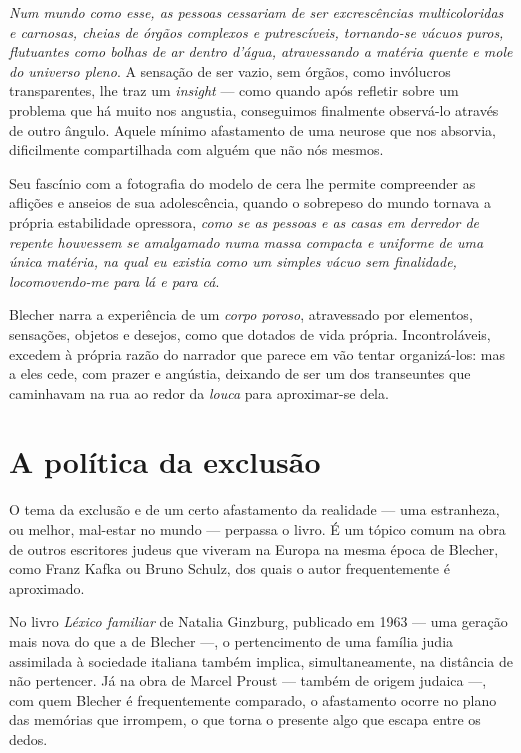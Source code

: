  \textit{Num mundo como esse, as pessoas cessariam de ser excrescências multicoloridas e carnosas, cheias de órgãos complexos e putrescíveis, tornando-se vácuos puros, flutuantes como bolhas de ar dentro d'água, atravessando a matéria quente e mole do universo pleno}. A sensação de ser vazio, sem órgãos, como invólucros transparentes, lhe traz um \textit{insight} --- como quando após refletir sobre um problema que há muito nos angustia, conseguimos finalmente observá-lo através de outro ângulo. Aquele mínimo afastamento de uma neurose que nos absorvia, dificilmente compartilhada com alguém que não nós mesmos.

Seu fascínio com a fotografia do modelo de cera lhe permite compreender as aflições e anseios de sua adolescência, quando o sobrepeso do mundo tornava a própria estabilidade opressora, \textit{como se as pessoas e as casas em derredor de repente houvessem se amalgamado numa massa compacta e uniforme de uma única matéria, na qual eu existia como um simples vácuo sem finalidade, locomovendo-me para lá e para cá}.

Blecher narra a experiência de um \textit{corpo poroso}, atravessado por elementos, sensações, objetos e desejos, como que dotados de vida própria. Incontroláveis, excedem à própria razão do narrador que parece em vão tentar organizá-los: mas a eles cede, com prazer e angústia, deixando de ser um dos transeuntes que caminhavam na rua ao redor da \textit{louca} para aproximar-se dela.

\section{A política da exclusão}

O tema da exclusão e de um certo afastamento da realidade --- uma estranheza, ou melhor, mal-estar no mundo --- perpassa o livro. É um tópico comum na obra de outros escritores judeus que viveram na Europa na mesma época de Blecher, como Franz Kafka ou Bruno Schulz, dos quais o autor frequentemente é aproximado. 

No livro \textit{Léxico familiar} de Natalia Ginzburg, publicado em 1963 --- uma geração mais nova do que a de Blecher ---, o pertencimento de uma família judia assimilada à sociedade italiana também implica, simultaneamente, na distância de não pertencer. Já na obra de Marcel Proust --- também de origem judaica ---, com quem Blecher é frequentemente comparado, o afastamento ocorre no plano das memórias que irrompem, o que torna o presente algo que escapa entre os dedos.

